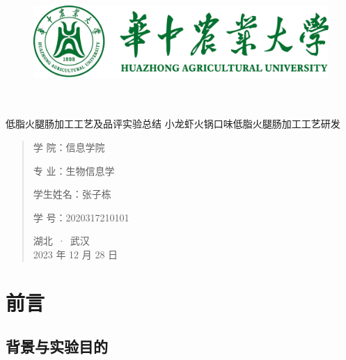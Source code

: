 \documentclass[UTF8]{ctexart}
\date{}
\begin{document}
	\begin{figure}[t]
		\centering
        \includegraphics[scale=0.7]{img/HZAU.png}
	\end{figure}

	\begin{center}
		\quad \\
		\quad \\
		\heiti \fontsize{45}{17} 低脂火腿肠加工工艺及品评实验总结
		\vskip 3.5cm
		\heiti {} 小龙虾火锅口味低脂火腿肠加工工艺研发
	\end{center}
	\vskip 3.5cm

	\begin{quotation}
		\heiti \fontsize{15}{15}
		\doublespacing
		\par\setlength\parindent{12em}
		\quad

		学\hspace{0.61cm} 院：信息学院

		专\hspace{0.61cm} 业：生物信息学

		学生姓名：张子栋

		学\hspace{0.61cm} 号：2020317210101


		\vskip 1.5cm
		\centering
        湖北~·~武汉\\
		2023 年 12 月 28 日
	\end{quotation}

	\newpage

    \tableofcontents
    
    \setcounter{page}{0}

    \thispagestyle{empty}

    \newpage

	\section{前言}
	\subsection{背景与实验目的}
\end{document}

